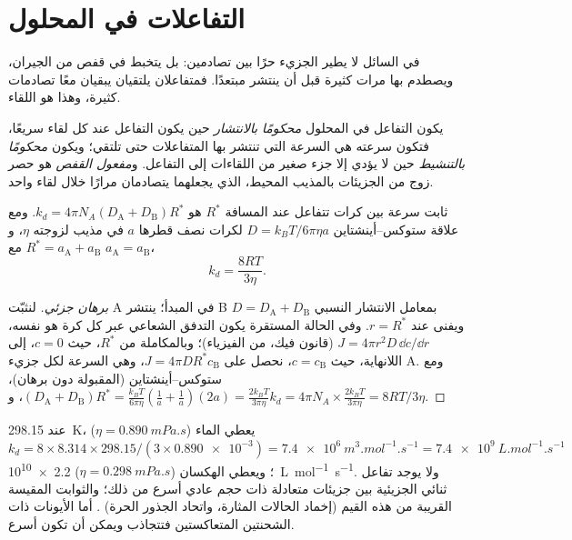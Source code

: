\section{التفاعلات في المحلول}

في السائل لا يطير الجزيء حرًا بين تصادمين: بل يتخبط في
قفص من الجيران، ويصطدم بها مرات كثيرة قبل أن ينتشر مبتعدًا.
فمتفاعلان يلتقيان يبقيان معًا تصادمات كثيرة، وهذا هو اللقاء.

\begin{definition}\label{def:b3:rate-theories:diffusion}
يكون التفاعل في المحلول \emph{محكومًا بالانتشار}
حين يكون التفاعل عند كل لقاء سريعًا، فتكون سرعته هي السرعة
التي تنتشر بها المتفاعلات حتى تلتقي؛ ويكون
\emph{محكومًا بالتنشيط} حين لا يؤدي إلا جزء صغير
من اللقاءات إلى التفاعل. و\emph{مفعول القفص}
هو حصر زوج من الجزيئات بالمذيب المحيط،
الذي يجعلهما يتصادمان مرارًا خلال لقاء واحد.
\end{definition}

\begin{proposition}[حد سمولوخوفسكي]\label{prop:b3:rate-theories:smoluchowski}
ثابت سرعة  بين كرات تتفاعل
عند المسافة $R^*$ هو $k_d = 4\pi N_A(D_{\mathrm A} + D_{\mathrm B})R^*$. ومع علاقة ستوكس--أينشتاين
$D = k_BT/6\pi\eta a$ لكرات نصف قطرها $a$ في مذيب لزوجته $\eta$،
و$R^* = a_{\mathrm A} + a_{\mathrm B}$ مع $a_{\mathrm A} = a_{\mathrm B}$،
\[
  k_d = \frac{8RT}{3\eta} .
\]
\end{proposition}

\begin{proof}[برهان جزئي]
لنثبّت A في المبدأ؛ ينتشر B بمعامل الانتشار النسبي $D =
D_{\mathrm A} + D_{\mathrm B}$ ويفنى عند $r = R^*$. وفي الحالة المستقرة يكون التدفق الشعاعي
عبر كل كرة هو نفسه، $J = 4\pi r^2D\,\dd c/\dd r$ (قانون فيك، من
الفيزياء)؛ وبالمكاملة من $R^*$، حيث $c = 0$، إلى اللانهاية، حيث $c = c_{\mathrm B}$، نحصل على
$J = 4\pi DR^*c_{\mathrm B}$، وهي السرعة لكل جزيء A. ومع ستوكس--أينشتاين (المقبولة دون برهان)،
$(D_{\mathrm A} + D_{\mathrm B})R^* = \frac{k_BT}{6\pi\eta}(\frac{1}{a} + \frac1a)(2a) = \frac{2k_BT}{3\pi\eta}$، و$k_d = 4\pi N_A \times
\frac{2k_BT}{3\pi\eta} = 8RT/3\eta$.
\end{proof}

\begin{example}\label{ex:b3:rate-theories:speed-limit}
عند \qty{298.15}{K}، يعطي الماء ($\eta = \qty{0.890}{mPa.s}$) $k_d = 8 \times 8.314 \times
298.15/(3 \times \num{0.890e-3}) = \qty{7.4e6}{m^3.mol^{-1}.s^{-1}} = \qty{7.4e9}{L.mol^{-1}.s^{-1}}$؛ ويعطي الهكسان
($\eta = \qty{0.298}{mPa.s}$) \qty{2.2e10}{L.mol^{-1}.s^{-1}}. ولا يوجد تفاعل ثنائي الجزيئية بين
جزيئات متعادلة ذات حجم عادي أسرع من ذلك؛ والثوابت المقيسة القريبة من هذه
القيم (إخماد الحالات المثارة، واتحاد الجذور الحرة) . أما الأيونات ذات الشحنتين المتعاكستين فتتجاذب ويمكن أن تكون أسرع.
\end{example}

